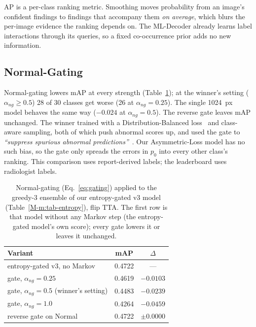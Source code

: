 \documentclass[conference]{IEEEtran}
\begin{document}
AP is a per-class ranking metric. Smoothing moves probability from an image's confident findings to findings that accompany them \emph{on average}, which blurs the per-image evidence the ranking depends on. The ML-Decoder already learns label interactions through its queries, so a fixed co-occurrence prior adds no new information.

\subsection{Normal-Gating}
Normal-gating lowers mAP at every strength (Table~\ref{tab:gating}); at the winner's setting ($\alpha_{ng} \ge 0.5$) 28 of 30 classes get worse (26 at $\alpha_{ng} = 0.25$). The single 1024~px model behaves the same way ($-0.024$ at $\alpha_{ng} = 0.5$). The reverse gate leaves mAP unchanged. The winner trained with a Distribution-Balanced loss~\cite{b23} and class-aware sampling, both of which push abnormal scores up, and used the gate to \emph{``suppress spurious abnormal predictions''}~\cite{b15}. Our Asymmetric-Loss model has no such bias, so the gate only spreads the errors in $p_0$ into every other class's ranking. This comparison uses report-derived labels; the leaderboard uses radiologist labels.

\begin{table}[htbp]
\caption{Normal-gating (Eq.~\eqref{eq:gating}) applied to the greedy-3 ensemble of our entropy-gated v3 model (Table~\ref{M-m:tab-entropy}), flip TTA. The first row is that model without any Markov step (the entropy-gated model's own score); every gate lowers it or leaves it unchanged.}
\begin{center}
\begin{tabular}{|l|c|c|}
\hline
\textbf{Variant} & \textbf{mAP} & \textbf{$\Delta$} \\
\hline
entropy-gated v3, no Markov & 0.4722 & --- \\
\hline
gate, $\alpha_{ng} = 0.25$ & 0.4619 & $-0.0103$ \\
\hline
gate, $\alpha_{ng} = 0.5$ (winner's setting) & 0.4483 & $-0.0239$ \\
\hline
gate, $\alpha_{ng} = 1.0$ & 0.4264 & $-0.0459$ \\
\hline
reverse gate on Normal & 0.4722 & $\pm 0.0000$ \\
\hline
\end{tabular}
\label{tab:gating}
\end{center}
\end{table}
\end{document}
